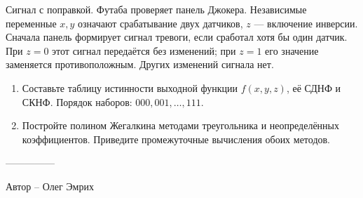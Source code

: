 \question
Сигнал с поправкой. Футаба проверяет панель Джокера. Независимые переменные $x,y$ означают срабатывание двух датчиков, $z$ --- включение инверсии. Сначала панель формирует сигнал тревоги, если сработал хотя бы один датчик. При $z=0$ этот сигнал передаётся без изменений; при $z=1$ его значение заменяется противоположным. Других изменений сигнала нет.
\begin{enumerate}
\item Составьте таблицу истинности выходной функции $f(x,y,z)$, её СДНФ и СКНФ. Порядок наборов: $000,001,\ldots,111$.
\item Постройте полином Жегалкина методами треугольника и неопределённых коэффициентов. Приведите промежуточные вычисления обоих методов.
\end{enumerate}

---------------

Автор -- Олег Эмрих

